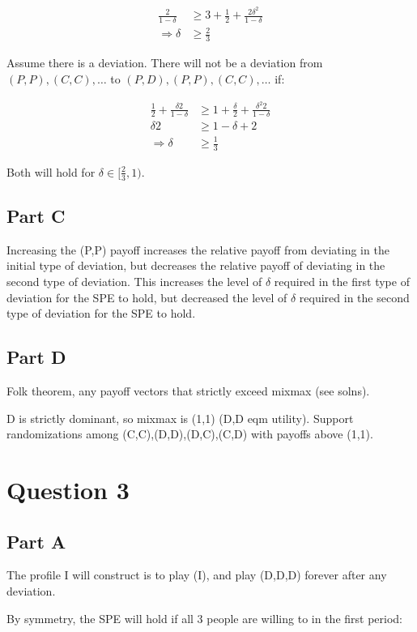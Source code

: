 \documentclass[11pt]{article} %
\begin{document}
\begin{align*}
\frac{2}{1-\delta} &\geq 3 + \frac{1}{2} + \frac{2\delta^2 }{1-\delta}\\
\Rightarrow \delta&\geq \frac{2}{3}
\end{align*}

Assume there is a deviation. There will not be a deviation from $(P,P),(C,C),\dots$ to $(P,D),(P,P),(C,C),\dots$ if:

\begin{align*}
\frac{1}{2} + \frac{\delta 2}{1-\delta} &\geq 1+\frac{\delta}{2}+ \frac{\delta^2 2}{1-\delta}\\
\delta 2 &\geq 1-\delta + 2\\
\Rightarrow  \delta&\geq \frac{1}{3}
\end{align*}

Both will hold for $\delta \in [\frac{2}{3},1)$.

\subsection{Part C}
Increasing the (P,P) payoff increases the relative payoff from deviating in the initial type of deviation, but decreases the relative payoff of deviating in the second type of deviation. This increases the level of $\delta$ required in the first type of deviation for the SPE to hold, but decreased the level of $\delta$ required in the second type of deviation for the SPE to hold.

\subsection{Part D}

Folk theorem, any payoff vectors that strictly exceed mixmax (see solns).

D is strictly dominant, so mixmax is (1,1) (D,D eqm utility). Support randomizations among (C,C),(D,D),(D,C),(C,D) with payoffs above (1,1). 

\section{Question 3}
\subsection{Part A}
The profile I will construct is to play (I), and play (D,D,D) forever after any deviation.

By symmetry, the SPE will hold if all 3 people are willing to in the first period:
\end{document}
